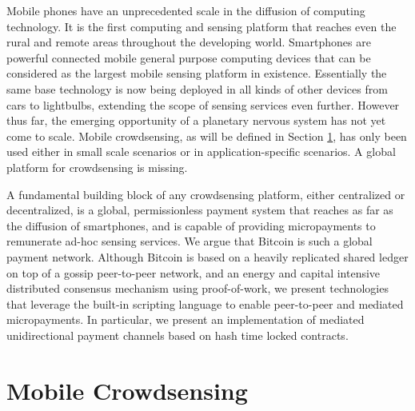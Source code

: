 
Mobile phones have an unprecedented scale in the diffusion of computing technology. It is the first computing and sensing platform that reaches even the rural and remote areas throughout the developing world. Smartphones are powerful connected mobile general purpose computing devices that can be considered as the largest mobile sensing platform in existence. Essentially the same base technology is now being deployed in all kinds of other devices from cars to lightbulbs, extending the scope of sensing services even further. However thus far, the emerging opportunity of a planetary nervous system \cite{giannotti2012planetary} has not yet come to scale. Mobile crowdsensing, as will be defined in Section \ref{sec:crowdsensing}, has only been used either in small scale scenarios or in application-specific scenarios. A global platform for crowdsensing is missing.



 A fundamental building block of any crowdsensing platform, either centralized or decentralized, is a global, permissionless payment system that reaches as far as the diffusion of smartphones, and is capable of providing micropayments to remunerate ad-hoc sensing services. We argue that Bitcoin is such a global payment network. Although Bitcoin is based on a heavily replicated shared ledger on top of a gossip peer-to-peer network, and an energy and capital intensive distributed consensus mechanism using proof-of-work, we present technologies that leverage the built-in scripting language to enable peer-to-peer and mediated micropayments. In particular, we present an implementation of mediated unidirectional payment channels based on hash time locked contracts.


\section{Mobile Crowdsensing}
\label{sec:crowdsensing}

